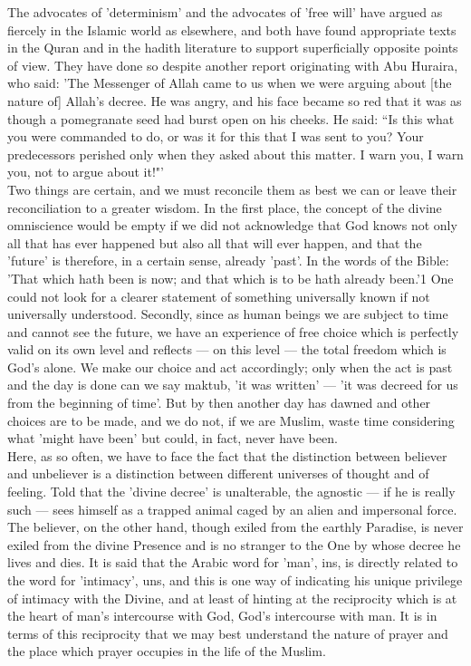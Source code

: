 \documentclass[10pt, twoside]{book}
\begin{document}
The advocates of 'determinism' and the advocates of 'free will' have argued as fiercely in the 
Islamic world as elsewhere, and both have found appropriate texts in the Quran and in the hadith 
literature to support superficially opposite points of view. They have done so despite another report 
originating with Abu Huraira, who said: 'The Messenger of Allah came to us when we were arguing about 
[the nature of] Allah's decree. He was angry, and his face became so red that it was as though a 
pomegranate seed had burst open on his cheeks. He said: ``Is this what you were commanded to do, or 
was it for this that I was sent to you? Your predecessors perished only when they asked about this 
matter. I warn you, I warn you, not to argue about it!"' \\

Two things are certain, and we must reconcile them as best we can or leave their reconciliation to a 
greater wisdom. In the first place, the concept of the divine omniscience would be empty if we did 
not acknowledge that God knows not only all that has ever happened but also all that will ever 
happen, and that the 'future' is therefore, in a certain sense, already 'past'. In the words of the 
Bible: 'That which hath been is now; and that which is to be hath already been.'1 One could not look 
for a clearer statement of something universally known if not universally understood. Secondly, since 
as human beings we are subject to time and cannot see the future, we have an experience of free 
choice which is perfectly valid on its own level and reflects --- on this level --- the total freedom 
which is God's alone. We make our choice and act accordingly; only when the act is past and the day 
is done can we say maktub, 'it was written' --- 'it was decreed for us from the beginning of time'. But 
by then another day has dawned and other choices are to be made, and we do not, if we are Muslim, 
waste time considering what 'might have been' but could, in fact, never have been. \\

Here, as so often, we have to face the fact that the distinction between believer and unbeliever is a 
distinction between different universes of thought and of feeling. Told that the 'divine decree' is 
unalterable, the agnostic --- if he is really such --- sees himself as a trapped animal caged by an alien 
and impersonal force. The believer, on the other hand, though exiled from the earthly Paradise, is 
never exiled from the divine Presence and is no stranger to the One by whose decree he lives and 
dies. It is said that the Arabic word for 'man', ins, is directly related to the word for 'intimacy', 
uns, and this is one way of indicating his unique privilege of intimacy with the Divine, and at least 
of hinting at the reciprocity which is at the heart of man's intercourse with God, God's intercourse 
with man. It is in terms of this reciprocity that we may best understand the nature of prayer and the 
place which prayer occupies in the life of the Muslim. \\
\end{document}
